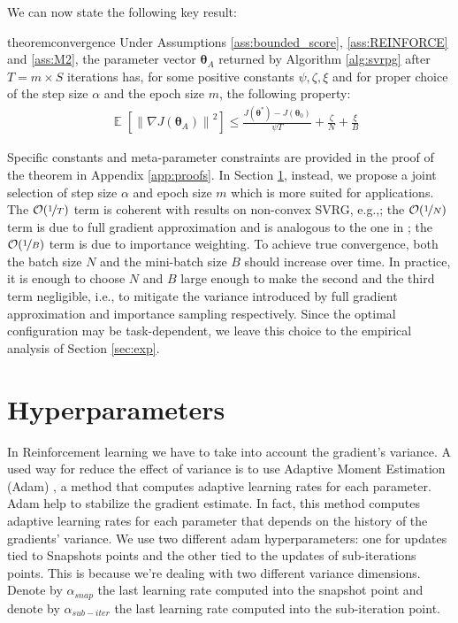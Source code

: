\documentclass{article}
\makeatletter
\theoremstyle{remark}
\theoremstyle{definition}
\DeclareRobustCommand{\eg}{e.g.,\@\xspace}
\DeclareRobustCommand{\ie}{i.e.,\@\xspace}
\DeclareMathOperator*{\EV}{\mathbb{E}}
\newcommand{\EVV}[2][\ppvect \in \ppspace]{\EV_{#1}\left[{#2}\right]}
\newcommand{\norm}[2][\infty]{\left\|#2\right\|_{#1}}
\newcommand{\vtheta}{\boldsymbol{\theta}}
\makeatother
\begin{document}
We can now state the following key result:
\begin{restatable}{theorem}{convergence}\label{theo:convergence}
Under Assumptions \ref{ass:bounded_score}, \ref{ass:REINFORCE} and \ref{ass:M2}, the parameter vector $\vtheta_A$ returned by Algorithm \ref{alg:svrpg} after $T=m\times S$ iterations has, for some positive constants $\psi,\zeta, \xi$ and for proper choice of the step size $\alpha$ and the epoch size $m$, the following property:
\begin{align*}
	&\EVV[]
	{\norm[]{\nabla J(\vtheta_A)}^2} 
		\leq
		\frac{J(\vtheta^*)-J(\vtheta_0)}{\psi T} +
		\frac{\zeta}{N}
		+\frac{\xi}{B}
\end{align*}
\end{restatable}
Specific constants and meta-parameter constraints are provided in the proof of the theorem in Appendix \ref{app:proofs}. In Section \ref{sec:stopping}, instead, we propose a joint selection of step size $\alpha$ and epoch size $m$ which is more suited for applications. 
The $\mathcal{O}(\nicefrac{1}{T})$ term is coherent with results on non-convex SVRG, \eg \cite{reddi2016stochastic}; the $\mathcal{O}(\nicefrac{1}{N})$ term is due to full gradient approximation and is analogous to the one in \cite{harikandeh2015stopwasting}; the $\mathcal{O}(\nicefrac{1}{B})$ term is due to importance weighting. To achieve true convergence, both the batch size $N$ and the mini-batch size $B$ should increase over time. In practice, it is enough to choose $N$ and $B$ large enough to make the second and the third term negligible, \ie to mitigate the variance introduced by full gradient approximation and importance sampling respectively. Since the optimal configuration may be task-dependent, we leave this choice to the empirical analysis of Section \ref{sec:exp}. 

\section{Hyperparameters}\label{sec:stopping}
In Reinforcement learning we have to take into account the gradient's variance.
A used way for reduce the effect of variance is to use Adaptive Moment Estimation (Adam) \cite{kingma2014adam}, a method that computes adaptive learning rates for each parameter. Adam help to stabilize the gradient estimate. In fact, this method computes adaptive learning rates for each parameter that depends on the history of the gradients' variance.
We use two different adam hyperparameters: one for updates tied to Snapshots points and the other tied to the updates of sub-iterations points. 
This is because we're dealing with two different variance dimensions.
Denote by $\alpha_{snap}$ the last learning rate computed into the snapshot point and denote by  $\alpha_{sub-iter}$ the last learning rate computed into the sub-iteration point.
\end{document}
